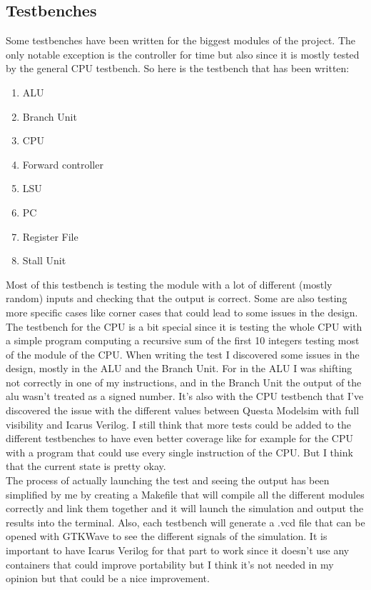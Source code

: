 \subsection{Testbenches}

Some testbenches have been written for the biggest modules of the project. The only notable exception is the 
controller for time but also since it is mostly tested by the general CPU testbench. So here is the testbench that has been written:

\begin{enumerate}[label={\textbullet}]
    \item ALU
    \item Branch Unit
    \item CPU
    \item Forward controller
    \item LSU
    \item PC
    \item Register File
    \item Stall Unit
\end{enumerate}

Most of this testbench is testing the module with a lot of different (mostly random) inputs and checking that the output is correct.
Some are also testing more specific cases like corner cases that could lead to some issues in the design. The testbench for the CPU is 
a bit special since it is testing the whole CPU with a simple program computing a recursive sum of the first 10 integers testing most 
of the module of the CPU.
When writing the test I discovered some issues in the design, mostly in the ALU and the Branch Unit. For in the ALU I was shifting 
not correctly in one of my instructions, and in the Branch Unit the output of the alu wasn't treated as a signed number.
It's also with the CPU testbench that I've discovered the issue with the different values between Questa Modelsim with full visibility and 
Icarus Verilog. 
I still think that more tests could be added to the different testbenches to have even better coverage like for example for the CPU with a 
program that could use every single instruction of the CPU. But I think that the current state is pretty okay. \\

The process of actually launching the test and seeing the output has been simplified by me by creating a Makefile that will compile all the 
different modules correctly and link them together and it will launch the simulation and output the results into the terminal. Also, each 
testbench will generate a .vcd file that can be opened with GTKWave to see the different signals of the simulation. It is important to have
Icarus Verilog for that part to work since it doesn't use any containers that could improve portability but I think it's not needed 
in my opinion but that could be a nice improvement.

